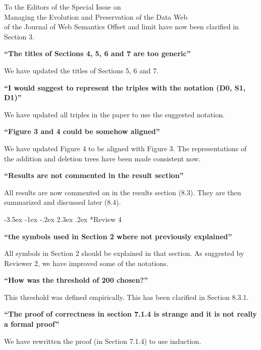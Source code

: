 \documentclass{letter}
\makeatletter
\newcounter{section}
\newcommand\section{\@startsection {section}{1}{\z@}%
                                   {-3.5ex \@plus -1ex \@minus -.2ex}%
                                   {2.3ex \@plus.2ex}%
                                   {\normalfont\Large\bfseries}}
\makeatother
\begin{document}
\begin{letter}{To the Editors of the Special Issue on\\Managing the Evolution and Preservation of the Data Web\\of the Journal of Web Semantics}
Offset and limit have now been clarified in Section 3.

\textbf{\enquote{The titles of Sections 4, 5, 6 and 7 are too generic}}

We have updated the titles of Sections 5, 6 and 7.

\textbf{\enquote{I would suggest to represent the triples with the notation (D0, S1, D1)}}

We have updated all triples in the paper to use the suggested notation.

\textbf{\enquote{Figure 3 and 4 could be somehow aligned}}

We have updated Figure 4 to be aligned with Figure 3.
The representations of the addition and deletion trees have been made consistent now.

\textbf{\enquote{Results are not commented in the result section}}

All results are now commented on in the results section (8.3).
They are then summarized and discussed later (8.4).

\section*{Review 4}

\textbf{\enquote{the symbols used in Section 2 where not previously explained}}

All symbols in Section 2 should  be explained in that section.
As suggested by Reviewer 2, we have improved some of the notations.

\textbf{\enquote{How was the threshold of 200 chosen?}}

This threshold was defined empirically.
This has been clarified in Section 8.3.1.

\textbf{\enquote{The proof of correctness in section 7.1.4 is strange and it is not really a formal proof}}

We have rewritten the proof (in Section 7.1.4) to use induction.

\end{letter}
\end{document}
